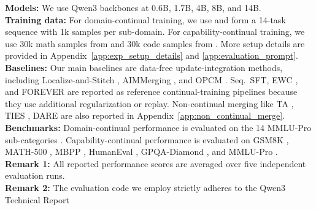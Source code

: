 \documentclass{article}
\begin{document}
\textbf{Models:}
We use Qwen3 backbones at 0.6B, 1.7B, 4B, 8B, and 14B.
\\
\textbf{Training data:}
For domain-continual training, we use \cite{mmlu_pro_cot_train_labeled} and form a 14-task sequence with 1k samples per sub-domain.
For capability-continual training, we use 30k math samples from \cite{nemotron_post_training_dataset_v1} and 30k code samples from \cite{zheng2024opencodeinterpreter}.
More setup details are provided in Appendix~\ref{app:exp_setup_details} and \ref{app:evaluation_prompt}.
\\
\textbf{Baselines:}
Our main baselines are data-free update-integration methods, including Localize-and-Stitch \cite{he2024localize}, AIMMerging \cite{feng2025aimmerging}, and OPCM \cite{tang2025merging}.
Seq.\ SFT, EWC \cite{kirkpatrick2017overcoming}, and FOREVER \cite{feng2026forever} are reported as reference continual-training pipelines because they use additional regularization or replay.
Non-continual merging like TA \cite{ilharcoediting}, TIES \cite{yadav2023ties}, DARE \cite{yu2024language} are also reported in Appendix~\ref{app:non_continual_merge}.
\\
\textbf{Benchmarks:}
Domain-continual performance is evaluated on the 14 MMLU-Pro sub-categories \cite{wang2024mmlu}.
Capability-continual performance is evaluated on GSM8K \cite{cobbe2021training}, MATH-500 \cite{hendrycks2measuring}, MBPP \cite{austin2021program}, HumanEval \cite{chen2021evaluating}, GPQA-Diamond \cite{reingpqa}, and MMLU-Pro \cite{wang2024mmlu}.
\\
\textbf{Remark 1:}
All reported performance scores are averaged over five independent evaluation runs.
\\
\textbf{Remark 2:}
The evaluation code we employ strictly adheres to the Qwen3 Technical Report \cite{yang2025qwen3}

\providecommand{\best}[1]{\textbf{#1}}
\providecommand{\ub}[1]{\underline{#1}}
\end{document}
